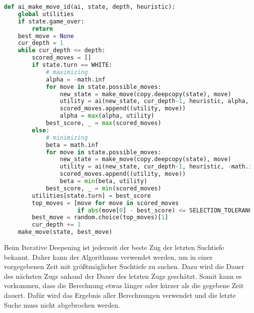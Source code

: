 \begin{lstlisting}[language=Python]
def ai_make_move_id(ai, state, depth, heuristic):
    global utilities
    if state.game_over:
        return
    best_move = None
    cur_depth = 1
    while cur_depth <= depth:
        scored_moves = []
        if state.turn == WHITE:
            # maximizing
            alpha = -math.inf
            for move in state.possible_moves:
                new_state = make_move(copy.deepcopy(state), move)
                utility = ai(new_state, cur_depth-1, heuristic, alpha, math.inf)
                scored_moves.append((utility, move))
                alpha = max(alpha, utility)
            best_score, _ = max(scored_moves)
        else:
            # minimizing
            beta = math.inf
            for move in state.possible_moves:
                new_state = make_move(copy.deepcopy(state), move)
                utility = ai(new_state, cur_depth-1, heuristic, -math.inf, beta)
                scored_moves.append((utility, move))
                beta = min(beta, utility)
            best_score, _ = min(scored_moves)
        utilities[state.turn] = best_score
        top_moves = [move for move in scored_moves
                     if abs(move[0] - best_score) <= SELECTION_TOLERANCE]
        best_move = random.choice(top_moves)[1]
        cur_depth += 1
    make_move(state, best_move)
\end{lstlisting}

Beim Iterative Deepening ist jederzeit der beste Zug der letzten
Suchtiefe bekannt. Daher kann der Algorithmus verwendet werden, um in
einer vorgegebenen Zeit mit größtmöglicher Suchtiefe zu suchen. Dazu
wird die Dauer des nächsten Zugs anhand der Dauer des letzten Zugs
geschätzt. Somit kann es vorkommen, dass die Berechnung etwas länger
oder kürzer als die gegebene Zeit dauert. Dafür wird das Ergebnis aller
Berechnungen verwendet und die letzte Suche muss nicht abgebrochen
werden.

